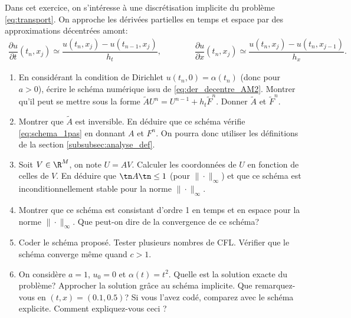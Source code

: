 \documentclass[12pt,a4paper,twoside]{article}
\begin{document}
\begin{exercise}
  \label{exo:transport_implicite}
  Dans cet exercice, on s'int\'eresse \`a une discr\'etisation implicite du probl\`eme
  \eqref{eq:transport}.
  On approche les d\'eriv\'ees partielles en temps et espace
  par des approximations d\'ecentr\'ees amont:
  \begin{align}
    \label{eq:der_decentre_AM2}
    \dfrac{\partial u}{\partial t}(t_n,x_j) \simeq \dfrac{u(t_{n},x_j) - u(t_{n-1},x_j)}{h_t} ,
    \qquad \qquad 
    \dfrac{\partial u}{\partial x}(t_n,x_j) \simeq \dfrac{u(t_n,x_{j}) - u(t_n,x_{j-1})}{h_x} .
  \end{align}
  
  \begin{enumerate}
  \item En consid\'erant la condition de Dirichlet $u(t_n,0) = \alpha(t_n)$ (donc pour $a>0$), 
    \'ecrire le sch\'ema num\'erique issu de \eqref{eq:der_decentre_AM2}.
    Montrer qu'il peut se mettre sous la forme $\widetilde{A} U^{n} = U^{n-1} + h_t \widetilde{F}^n$.
    Donner $\widetilde{A}$ et $\widetilde{F}^n$.
  \item Montrer que $\widetilde{A}$ est inversible. En d\'eduire que ce sch\'ema v\'erifie
    \eqref{eq:schema_1pas} en donnant $A$ et $F^n$.
    On pourra donc utiliser les d\'efinitions de la section \ref{subsubsec:analyse_def}.
  \item Soit $V \in \R^M$, on note $U = A V$. 
    Calculer les coordonn\'ees de $U$ en fonction de celles de $V$.
    En d\'eduire que $\tn A \tn \leq 1$ (pour $\| \cdot \|_{\infty}$) et que
    ce sch\'ema est inconditionnellement stable pour la norme $\| \cdot \|_{\infty}$.
    
  \item Montrer que ce sch\'ema est consistant d'ordre 1 en temps et en espace
    pour la norme $\| \cdot \|_{\infty}$.
    Que peut-on dire de la convergence de ce sch\'ema?

  \item Coder le sch\'ema propos\'e.
    Tester plusieurs nombres de CFL.
    V\'erifier que le sch\'ema converge m\^eme quand $c > 1$.


  \item On consid\`ere $a=1$, $u_0 = 0$ et $\alpha(t) = t^2$.
    Quelle est la solution exacte du probl\`eme?
    Approcher la solution gr\^ace au sch\'ema implicite.
    Que remarquez-vous en $(t,x)=(0.1,0.5)$?
    Si vous l'avez cod\'e, comparez avec le sch\'ema explicite.
    Comment expliquez-vous ceci ?
    

\end{enumerate}
\end{exercise}
\end{document}
